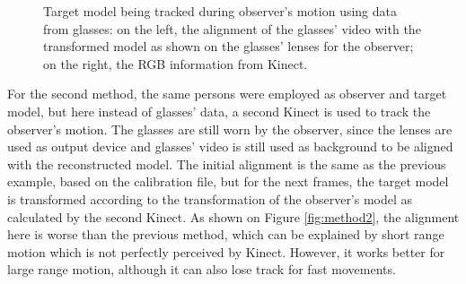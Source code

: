 \documentclass[msc, a4paper, classic, en]{ufbathesis}
\begin{document}
\begin{figure}
\centering
{}
\caption{Target model being tracked during observer's motion using data from glasses: on the left, the alignment of the glasses' video with the transformed model as shown on the glasses' lenses for the observer; on the right, the RGB information from Kinect.}
\label{fig:method1}
\end{figure}

For the second method, the same persons were employed as observer and target model, but here instead of glasses' data, a second Kinect is used to track the observer's motion. The glasses are still worn by the observer, since the lenses are used as output device and glasses' video is still used as background to be aligned with the reconstructed model. The initial alignment is the same as the previous example, based on the calibration file, but for the next frames, the target model is transformed according to the transformation of the observer's model as calculated by the second Kinect. As shown on Figure \ref{fig:method2}, the alignment here is worse than the previous method, which can be explained by short range motion which is not perfectly perceived by Kinect. However, it works better for large range motion, although it can also lose track for fast movements.
\end{document}

